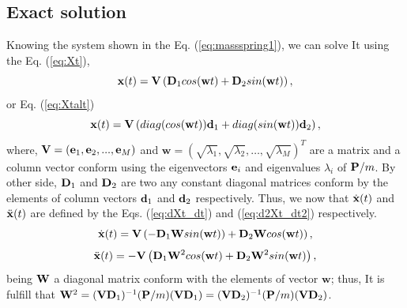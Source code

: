 \documentclass[11pt,twoside,a4paper]{article}
\newcommand{\MATRIX}[1]{\mathbf{\uppercase{#1}}}
\newcommand{\VECTOR}[1]{\mathbf{\lowercase{#1}}}
\newcommand{\funcdiag}{diag}
\begin{document}
\subsection{Exact solution}
Knowing the system shown in the Eq. (\ref{eq:massspring1}), we can solve It
using the Eq. (\ref{eq:Xt}),
\begin{equation}\label{eq:Xt}
 \VECTOR{X}(t)= \MATRIX{V}\left(\MATRIX{D}_1 cos(\mathbf{w}t) + \MATRIX{D}_2 sin(\mathbf{w}t) \right),
\end{equation}
or Eq. (\ref{eq:Xtalt})
\begin{equation}\label{eq:Xtalt}
 \VECTOR{X}(t)= \MATRIX{V}\left( \funcdiag(cos(\VECTOR{w}t))\VECTOR{d}_1 +  \funcdiag(sin(\VECTOR{w}t))\VECTOR{d}_2 \right),
\end{equation}
where, $\MATRIX{V}=\left(\VECTOR{e}_1,\VECTOR{e}_2, ..., \VECTOR{e}_M \right)$ and 
$\mathbf{w}=\left( \sqrt{\lambda_1},\sqrt{\lambda_2},\dots ,\sqrt{\lambda_M}\right)^{T}$ 
are a matrix and a column 
vector conform using the eigenvectors $\VECTOR{e}_i$ and eigenvalues $\lambda_i$ of
$\MATRIX{P}/m$.
By other side, $\MATRIX{D}_1$ and $\MATRIX{D}_2$ are two any constant diagonal matrices
conform by the elements of column vectors $\VECTOR{d}_1$ and $\VECTOR{d}_2$ respectively.
Thus, we now that $\dot{\VECTOR{X}}(t)$ and $\ddot{\VECTOR{X}}(t)$ are defined by the Eqs. (\ref{eq:dXt_dt})
and (\ref{eq:d2Xt_dt2}) respectively.
\begin{equation}\label{eq:dXt_dt}
 \dot{\VECTOR{X}}(t)= \MATRIX{V}\left(-\MATRIX{D}_1 \MATRIX{W} sin(\mathbf{w}t)) + \MATRIX{D}_2 \MATRIX{W} cos(\mathbf{w}t) \right),
\end{equation}
\begin{equation}\label{eq:d2Xt_dt2}
 \ddot{\VECTOR{X}}(t)= -\MATRIX{V}\left(\MATRIX{D}_1 \MATRIX{W}^2 cos(\mathbf{w}t) + \MATRIX{D}_2 \MATRIX{W}^2 sin(\mathbf{w}t) \right),
\end{equation}
being $\MATRIX{W}$ a diagonal matrix conform with the elements of vector $\mathbf{w}$;
thus, It is fulfill that $\MATRIX{W}^2=(\MATRIX{V} \MATRIX{D}_1)^{-1}(\MATRIX{P}/m)(\MATRIX{V} \MATRIX{D}_1)=(\MATRIX{V} \MATRIX{D}_2)^{-1}(\MATRIX{P}/m)( \MATRIX{V} \MATRIX{D}_2)$.
\end{document}
